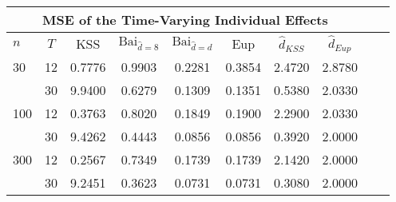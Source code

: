 \begin{tabular}{lccccccccc} 
\hline \multicolumn{8}{c}{MSE of the Time-Varying Individual Effects} \\ \hline 
$n$ & $T$ & KSS & $ \text{Bai}_{\hat{d} = 8}$ & $\text{Bai}_{\hat{d} = d}$ & Eup & $\hat{d}_{KSS}$ & $\hat{d}_{Eup}$ \\
\hline
30 & 12 &  0.7776  &  0.9903  &  0.2281  &  0.3854  &  2.4720  &  2.8780  \\
& 30 &  9.9400  &  0.6279  &  0.1309  &  0.1351  &  0.5380  &  2.0330  \\
100 & 12 &  0.3763  &  0.8020  &  0.1849  &  0.1900  &  2.2900  &  2.0330  \\
& 30 &  9.4262  &  0.4443  &  0.0856  &  0.0856  &  0.3920  &  2.0000  \\
300 & 12 &  0.2567  &  0.7349  &  0.1739  &  0.1739  &  2.1420  &  2.0000  \\
& 30 &  9.2451  &  0.3623  &  0.0731  &  0.0731  &  0.3080  &  2.0000  \\
\end{tabular} 

